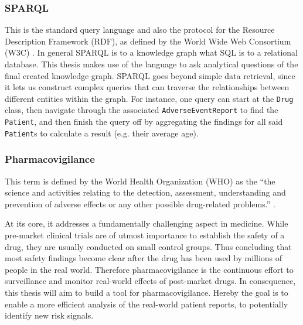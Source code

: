 \subsubsection{SPARQL}
This is the standard query language and also the protocol for the Resource Description Framework (RDF), as defined by the World Wide Web Consortium (W3C) \cite{W3C2013sparql}. In general SPARQL is to a knowledge graph what SQL is to a relational database. This thesis makes use of the language to ask analytical questions of the final created knowledge graph. SPARQL goes beyond simple data retrieval, since it lets us construct complex queries that can traverse the relationships between different entities within the graph. For instance, one query can start at the \texttt{Drug} class, then navigate through the associated \texttt{AdverseEventReport} to find the \texttt{Patient}, and then finish the query off by aggregating the findings for all said \texttt{Patient}s to calculate a result (e.g. their average age). 
\subsubsection{Pharmacovigilance}
This term is defined by the World Health Organization (WHO) as the “the science and activities relating to the detection, assessment, understanding and prevention of adverse effects or any other possible drug-related
problems.” \cite{WHO2002pharmacovigilance}.

At its core, it addresses a fundamentally challenging aspect in medicine. While pre-market clinical trials are of utmost importance to establish the safety of a drug, they are usually conducted on small control groups. Thus concluding that most safety findings become clear after the drug has been used by millions of people in the real world. Therefore pharmacovigilance is the continuous effort to surveillance and monitor real-world effects of post-market drugs. In consequence, this thesis will aim to build a tool for pharmacovigilance. Hereby the goal is to enable a more efficient analysis of the real-world patient reports, to potentially identify new risk signals.

